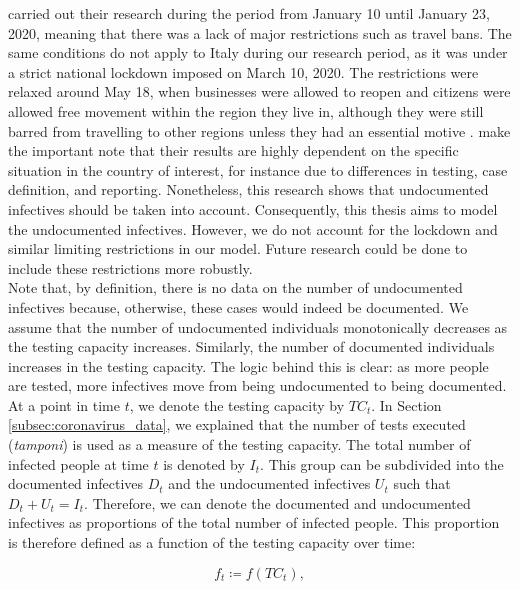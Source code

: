 \documentclass[12pt]{article}
\begin{document}
	\textcite{li2020undocumented} carried out their research during the period from January 10 until January 23, 2020, meaning that there was a lack of major restrictions such as travel bans. The same conditions do not apply to Italy during our research period, as it was under a strict national lockdown imposed on March 10, 2020. The restrictions were relaxed around May 18, when businesses were allowed to reopen and citizens were allowed free movement within the region they live in, although they were still barred from travelling to other regions unless they had an essential motive \parencite{severgnini2020relaxLockdown}. \textcite{li2020undocumented} make the important note that their results are highly dependent on the specific situation in the country of interest, for instance due to differences in testing, case definition, and reporting. Nonetheless, this research shows that undocumented infectives should be taken into account. Consequently, this thesis aims to model the undocumented infectives. However, we do not account for the lockdown and similar limiting restrictions in our model. Future research could be done to include these restrictions more robustly. \\
	
	Note that, by definition, there is no data on the number of undocumented infectives because, otherwise, these cases would indeed be documented. We assume that the number of undocumented individuals monotonically decreases as the testing capacity increases. Similarly, the number of documented individuals increases in the testing capacity. The logic behind this is clear: as more people are tested, more infectives move from being undocumented to being documented. \\
	
	At a point in time $t$, we denote the testing capacity by $TC_t$. In Section \ref{subsec:coronavirus_data}, we explained that the number of tests executed (\textit{tamponi}) is used as a measure of the testing capacity. The total number of infected people at time $t$ is denoted by $I_t$. This group can be subdivided into the documented infectives $D_t$ and the undocumented infectives $U_t$ such that $D_t + U_t = I_t$. Therefore, we can denote the documented and undocumented infectives as proportions of the total number of infected people. This proportion is therefore defined as a function of the testing capacity over time:
	
    	\begin{equation} \label{eq:f_t}
    	    f_t \coloneqq f(TC_t),
    	\end{equation}
	
\end{document}
